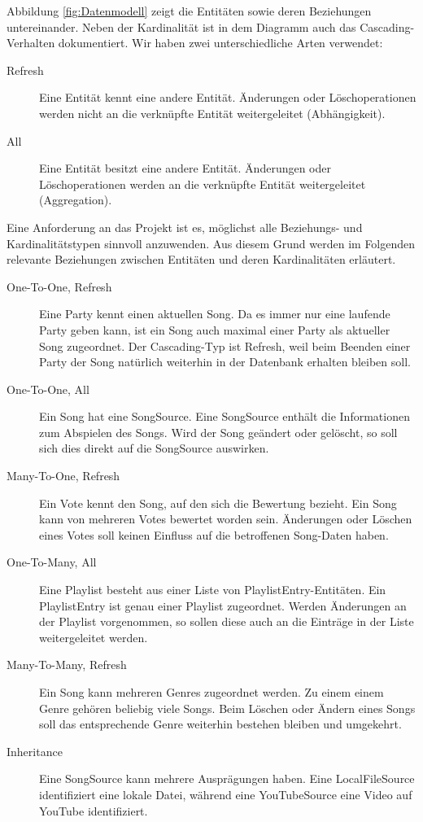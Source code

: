 Abbildung \ref{fig:Datenmodell} zeigt die Entitäten sowie deren Beziehungen untereinander. Neben der Kardinalität ist in dem Diagramm auch das Cascading-Verhalten dokumentiert. Wir haben zwei unterschiedliche Arten verwendet:
\begin{description}
	\item[Refresh] Eine Entität kennt eine andere Entität. Änderungen oder Löschoperationen werden nicht an die verknüpfte Entität weitergeleitet (Abhängigkeit).
	\item[All] Eine Entität besitzt eine andere Entität. 
	Änderungen oder Löschoperationen werden an die 
	verknüpfte Entität weitergeleitet (Aggregation).
\end{description}

Eine Anforderung an das Projekt ist es, möglichst alle Beziehungs- und Kardinalitätstypen sinnvoll anzuwenden. Aus diesem Grund werden im Folgenden relevante Beziehungen zwischen Entitäten und deren Kardinalitäten erläutert.

\begin{description}
	\item[One-To-One, Refresh] Eine Party kennt einen aktuellen Song. Da es immer nur eine laufende Party geben kann, ist ein Song auch maximal einer Party als aktueller Song zugeordnet. Der Cascading-Typ ist Refresh, weil beim Beenden einer Party der Song natürlich weiterhin in der Datenbank erhalten bleiben soll.
	\item[One-To-One, All] Ein Song hat eine SongSource. Eine SongSource enthält die Informationen zum Abspielen des Songs. Wird der Song geändert oder gelöscht, so soll sich dies direkt auf die SongSource auswirken.
	\item[Many-To-One, Refresh] Ein Vote kennt den Song, auf den sich die Bewertung bezieht. Ein Song kann von mehreren Votes bewertet worden sein. Änderungen oder Löschen eines Votes soll keinen Einfluss auf die betroffenen Song-Daten haben.
	\item[One-To-Many, All] Eine Playlist besteht aus einer Liste von PlaylistEntry-Entitäten. Ein PlaylistEntry ist genau einer Playlist zugeordnet. Werden Änderungen an der Playlist vorgenommen, so sollen diese auch an die Einträge
	in der Liste weitergeleitet werden.
	\item[Many-To-Many, Refresh] Ein Song kann mehreren Genres zugeordnet werden. Zu einem einem Genre gehören beliebig viele Songs. Beim Löschen oder Ändern eines Songs soll das entsprechende Genre weiterhin bestehen bleiben und umgekehrt.
	\item[Inheritance] Eine SongSource kann mehrere Ausprägungen haben. Eine LocalFileSource identifiziert eine lokale Datei, während eine YouTubeSource eine Video auf YouTube identifiziert.
\end{description}



